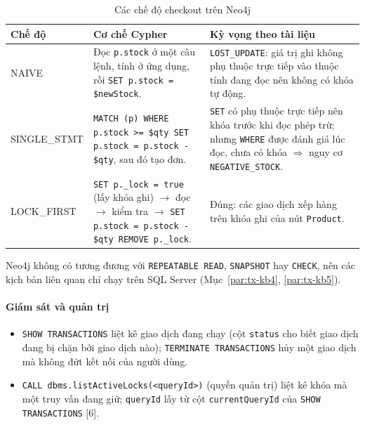 \begin{table}[htbp]
\centering
\caption{Các chế độ checkout trên Neo4j}
\label{tab:tx-neo4j-modes}
\renewcommand{\arraystretch}{1.25}
\begin{tabularx}{\textwidth}{>{\ttfamily}l X X}
\toprule
\normalfont\textbf{Chế độ} & \textbf{Cơ chế Cypher} & \textbf{Kỳ vọng theo tài liệu} \\
\midrule
NAIVE & Đọc \texttt{p.stock} ở một câu lệnh, tính ở ứng dụng, rồi \texttt{SET p.stock = \$newStock}. & \texttt{LOST\_UPDATE}: giá trị ghi không phụ thuộc trực tiếp vào thuộc tính đang đọc nên không có khóa tự động. \\
SINGLE\_STMT & \texttt{MATCH (p) WHERE p.stock >= \$qty SET p.stock = p.stock - \$qty}, sau đó tạo đơn. & \texttt{SET} có phụ thuộc trực tiếp nên khóa trước khi đọc phép trừ; nhưng \texttt{WHERE} được đánh giá lúc đọc, chưa có khóa $\Rightarrow$ nguy cơ \texttt{NEGATIVE\_STOCK}. \\
LOCK\_FIRST & \texttt{SET p.\_lock = true} (lấy khóa ghi) $\rightarrow$ đọc $\rightarrow$ kiểm tra $\rightarrow$ \texttt{SET p.stock = p.stock - \$qty REMOVE p.\_lock}. & Đúng: các giao dịch xếp hàng trên khóa ghi của nút \texttt{Product}. \\
\bottomrule
\end{tabularx}
\end{table}

Neo4j không có tương đương với \texttt{REPEATABLE READ}, \texttt{SNAPSHOT} hay \texttt{CHECK}, nên các kịch bản liên quan chỉ chạy trên SQL Server (Mục~\ref{par:tx-kb4}, \ref{par:tx-kb5}).

\paragraph{Giám sát và quản trị}\mbox{}

\begin{itemize}
    \item \texttt{SHOW TRANSACTIONS} liệt kê giao dịch đang chạy (cột \texttt{status} cho biết giao dịch đang bị chặn bởi giao dịch nào); \texttt{TERMINATE TRANSACTIONS} hủy một giao dịch mà không đứt kết nối của người dùng.
    \item \texttt{CALL dbms.listActiveLocks(<queryId>)} (quyền quản trị) liệt kê khóa mà một truy vấn đang giữ; \texttt{queryId} lấy từ cột \texttt{currentQueryId} của \texttt{SHOW TRANSACTIONS} [6].
\end{itemize}


